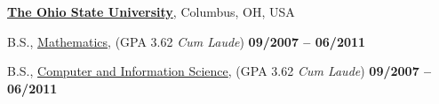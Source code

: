 \href{http://www.osu.edu/}{\textbf{The Ohio State University}},
Columbus, OH, USA
\vspace{-0.5em}
\begin{outerlist}

\item[] B.S.,
        \href{http://www.math.osu.edu/}
             {Mathematics}, (GPA 3.62 \emph{Cum Laude})
	\hfill \textbf{09/2007 -- 06/2011}
\vspace{-0.5em}
\item[] B.S.,
        \href{http://www.cse.osu.edu/}
             {Computer and Information Science}, (GPA 3.62 \emph{Cum Laude})
             \hfill \textbf{09/2007 -- 06/2011}


\end{outerlist}
